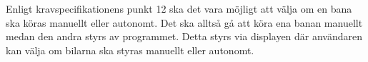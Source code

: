 Enligt kravspecifikationens punkt 12 ska det vara möjligt att välja om en bana ska köras manuellt eller autonomt. Det ska alltså gå att köra ena banan manuellt medan den andra styrs av programmet. Detta styrs via displayen där användaren kan välja om bilarna ska styras manuellt eller autonomt. 

